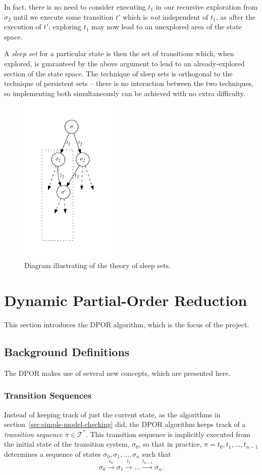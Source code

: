 \documentclass[12pt,a4paper,twoside,openright]{report}
\begin{document}
In fact, there is no need to consider executing
$t_1$ in our recursive exploration from $\sigma_2$
until we execute some transition $t'$ which is
\emph{not} independent of $t_1$, as after
the execution of $t'$, exploring $t_1$ may
now lead to an unexplored area of the state space.

A \emph{sleep set} for a particular state
is then the set of transitions which, when
explored, is guaranteed by the above
argument to lead to an already-explored
section of the state space. The technique of
sleep sets is orthogonal to the technique
of persistent sets -- there is no interaction
between the two techniques, so implementing
both simultaneously can be achieved with
no extra difficulty.

\begin{figure}[h]
	\centering
	\includegraphics[height=8cm]{sleep}
	\caption{Diagram illustrating of the theory
		of sleep sets.}
	\label{fig:sleep}
\end{figure}

\section{Dynamic Partial-Order Reduction}
This section introduces the DPOR algorithm,
which is the focus of the project.

\subsection{Background Definitions}
The DPOR makes use of several new concepts,
which are presented here.

\subsubsection{Transition Sequences}
Instead of keeping track of just the current state, as
the algorithms in section~\ref{sec:simple-model-checking}
did, the DPOR algorithm keeps track of a \emph{transition
sequence} $\pi \in \mathcal{T}^*$. This transition
sequence is implicitly executed from the initial state of
the transition system, $\sigma_0$, so that in practice,
$\pi = t_0, t_1, \ldots, t_{n-1}$ determines a sequence of states
$\sigma_0, \sigma_1, \ldots, \sigma_n$ such that
\[
	\sigma_0 \xrightarrow{\ t_0\ } \sigma_1 \xrightarrow{\ t_1\ }
	\ldots \xrightarrow{t_{n-1}} \sigma_n.
\]
\end{document}
